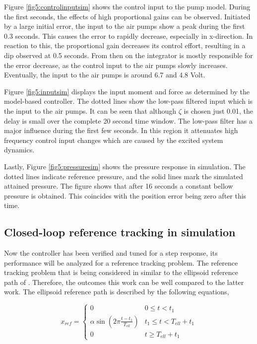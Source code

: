 Figure \ref{fig5:controlinputsim} shows the control input to the pump model. During the first seconds, the effects of high proportional gains can be observed. Initiated by a large initial error, the input to the air pumps show a peak during the first 0.3 seconds. This causes the error to rapidly decrease, especially in x-direction. In reaction to this, the proportional gain decreases its control effort, resulting in a dip observed at 0.5 seconds. From then on the integrator is mostly responsible for the error decrease, as the control input to the air pumps slowly increases. Eventually, the input to the air pumps is around 6.7 and 4.8 Volt. 

Figure \ref{fig5:inputsim} displays the input moment and force as determined by the model-based controller. The dotted lines show the low-pass filtered input which is the input to the air pumps. It can be seen that although $\zeta$ is chosen just 0.01, the delay is small over the complete 20 second time window. The low-pass filter has a major influence during the first few seconds. In this region it attenuates high frequency control input changes which are caused by the excited system dynamics. 


Lastly, Figure \ref{fig5:pressuresim} shows the pressure response in simulation. The dotted lines indicate reference pressure, and the solid lines mark the simulated attained pressure. The figure shows that after 16 seconds a constant bellow pressure is obtained. This coincides with the position error being zero after this time.



\subsection*{Closed-loop reference tracking in simulation}

Now the controller has been verified and tuned for a step response, its performance will be analyzed for a reference tracking problem. The reference tracking problem that is being considered in similar to the ellipsoid reference path of \cite{berkers}. Therefore, the outcomes this work can be well compared to the latter work. The ellipsoid reference path is described by the following equations,

\begin{equation}
    x_{ref} = \begin{cases} 
      0 &  0 \leq t < t_1 \\
     \alpha \sin(2\pi \frac{t - t_1}{T_{ell}}) &t_1 \leq t  < T_{ell} + t_1 \\
     0 & t \geq T_{ell} + t_1
   \end{cases} 
\end{equation}


